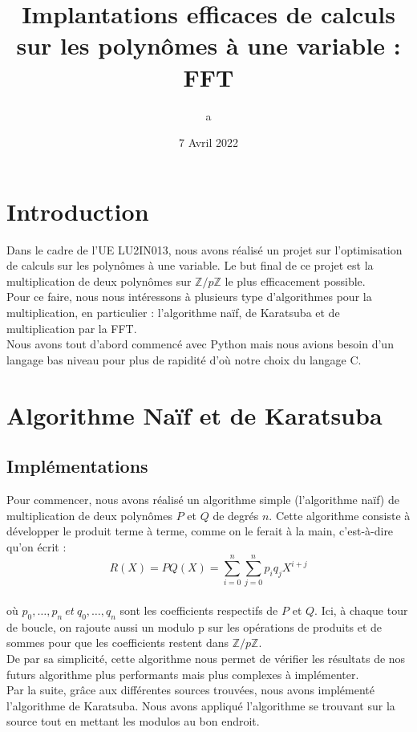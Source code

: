 \documentclass[12pt, a4paper]{article}
\title{Implantations efficaces de calculs sur les polynômes à une variable : FFT}
\author{a}
\date{7 Avril 2022}
\begin{document}
\maketitle
\tableofcontents
\newpage

\section*{Introduction}
Dans le cadre de l'UE LU2IN013, nous avons réalisé un projet sur l'optimisation de calculs sur les polynômes à une variable. Le but final de ce projet est la multiplication de deux polynômes sur $\mathbb{Z}/p\mathbb{Z}$ le plus efficacement possible.\\
Pour ce faire, nous nous intéressons à plusieurs type d'algorithmes pour la multiplication, en particulier : l'algorithme naïf, de Karatsuba et de multiplication par la FFT.\\
Nous avons tout d'abord commencé avec Python mais nous avions besoin d'un langage bas niveau pour plus de rapidité d'où notre choix du langage C.

\section{Algorithme Naïf et de Karatsuba}
\subsection{Implémentations}

Pour commencer, nous avons réalisé un algorithme simple (l'algorithme naïf) de multiplication de deux polynômes $P$ et $Q$ de degrés $n$. Cette algorithme consiste à développer le produit terme à terme, comme on le ferait à la main, c'est-à-dire qu'on écrit : \\
\[R(X) = PQ(X) =
\displaystyle\sum_{i=0}^{n}\sum_{j=0}^{n} p_i q_j X^{i+j}\] \\
où $p_0,\dots,p_n\ et\ q_0,\dots,q_n$ sont les coefficients respectifs de $P$ et $Q$. Ici, à chaque tour de boucle, on rajoute aussi un modulo p sur les opérations de produits et de sommes pour que les coefficients restent dans $\mathbb{Z}/p\mathbb{Z}$.\\
De par sa simplicité, cette algorithme nous permet de vérifier les résultats de nos futurs algorithme plus performants mais plus complexes à implémenter.\\
Par la suite, grâce aux différentes sources 
trouvées, nous avons implémenté l'algorithme de Karatsuba. Nous avons appliqué l'algorithme se trouvant sur la source \cite{Karatsuba} tout en mettant les modulos au bon endroit.
\end{document}
